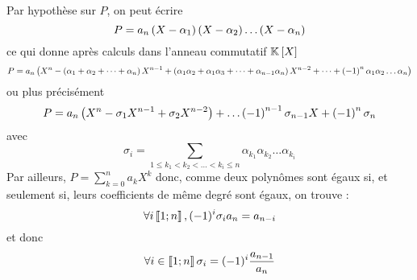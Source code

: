 \begin{dem}
    Par hypothèse sur \(P\), on peut écrire
    \[P = a_n\left(X-\alpha_1\right)\left(X-\alpha_2\right)\dots \left(X-\alpha_n\right)\]
    ce qui donne après calculs dans l’anneau commutatif \(\mathbb{K} \left[X\right]\)
    \[P = a_n\left(X^n - \left(\alpha_1 + \alpha_2 + \dots + \alpha_n\right)X^{n-1} + \left(\alpha_1 \alpha_2 + \alpha_1 \alpha_3 + \dots + \alpha_{n-1} \alpha_n\right)X^{n-2} + \dots + \left(-1\right)^n \alpha_1 \alpha_2 \dots \alpha_n\right)\]
    ou plus précisément 
    \[P = a_n \left(X^n - \sigma_1 X^{n-1} + \sigma_2 X^{n-2}\right) + \dots \left(-1\right)^{n-1} \sigma_{n-1}X + \left(-1\right)^n \sigma_n\]
    avec 
    \[\sigma_i = \sum_{1 \leq k_1 < k_2 <\dots< k_i \leq n} \alpha_{k_1} \alpha_{k_2} \dots \alpha_{k_i}\]
    Par ailleurs, \(P = \sum_{k=0}^n a_k X^k\) donc, comme deux polynômes sont égaux si, et seulement si, leurs coefficients de même degré sont égaux, on trouve :
    \[\forall i \left\llbracket1;n\right\rrbracket, (-1)^i \sigma_i a_n = a_{n-i}\] 
    et donc \[\forall i \in \left\llbracket1;n\right\rrbracket \sigma_i = (-1)^i \frac{a_{n-1}}{a_n}\]
\end{dem}